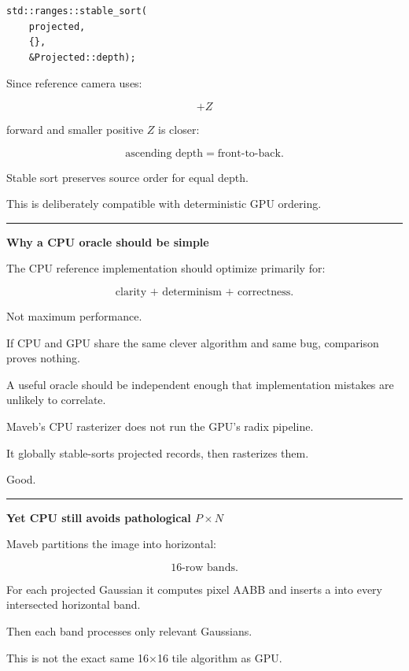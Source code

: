 \begin{verbatim}
std::ranges::stable_sort(
    projected,
    {},
    &Projected::depth);
\end{verbatim}

Since reference camera uses:

\[
+Z
\]

forward and smaller positive \(Z\) is closer:

\[
\boxed{
\text{ascending depth}
=
\text{front-to-back}.
}
\]

Stable sort preserves source order for equal depth.

This is deliberately compatible with deterministic GPU ordering.

\begin{center}\rule{0.5\linewidth}{0.5pt}\end{center}

\textbf{Why a CPU oracle should be simple}

The CPU reference implementation should optimize primarily for:

\[
\boxed{
\text{clarity + determinism + correctness}.
}
\]

Not maximum performance.

If CPU and GPU share the same clever algorithm and same bug, comparison proves nothing.

A useful oracle should be independent enough that implementation mistakes are unlikely to correlate.

Maveb's CPU rasterizer does not run the GPU's radix pipeline.

It globally stable-sorts projected records, then rasterizes them.

Good.

\begin{center}\rule{0.5\linewidth}{0.5pt}\end{center}

\textbf{Yet CPU still avoids pathological \(P\times N\)}

Maveb partitions the image into horizontal:

\[
16\text{-row bands}.
\]

For each projected Gaussian it computes pixel AABB and inserts a  into every intersected horizontal band.

Then each band processes only relevant Gaussians.

This is not the exact same 16×16 tile algorithm as GPU.

